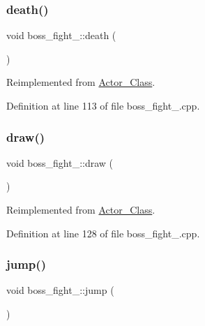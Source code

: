 \subsubsection{\texorpdfstring{death()}{death()}}
{\footnotesize\ttfamily void boss\+\_\+fight\+\_\+::death (\begin{DoxyParamCaption}{ }\end{DoxyParamCaption})\hspace{0.3cm}{\ttfamily [virtual]}}



Reimplemented from \hyperlink{class_actor___class_a9447c6154a674d7e6bdf24ff2874b7a8}{Actor\+\_\+\+Class}.



Definition at line 113 of file boss\+\_\+fight\+\_.\+cpp.

\hypertarget{classboss__fight__1_a83b20e761e3f8781c8fee8d2be5442b0}{}\label{classboss__fight__1_a83b20e761e3f8781c8fee8d2be5442b0} 
\subsubsection{\texorpdfstring{draw()}{draw()}}
{\footnotesize\ttfamily void boss\+\_\+fight\+\_\+::draw (\begin{DoxyParamCaption}{ }\end{DoxyParamCaption})\hspace{0.3cm}{\ttfamily [virtual]}}



Reimplemented from \hyperlink{class_actor___class_ac49cd62be76b4b950ecbe155413f1b64}{Actor\+\_\+\+Class}.



Definition at line 128 of file boss\+\_\+fight\+\_.\+cpp.

\hypertarget{classboss__fight__1_a363121fd16c5d41889f96405544bccc1}{}\label{classboss__fight__1_a363121fd16c5d41889f96405544bccc1} 
\subsubsection{\texorpdfstring{jump()}{jump()}}
{\footnotesize\ttfamily void boss\+\_\+fight\+\_\+::jump (\begin{DoxyParamCaption}{ }\end{DoxyParamCaption})\hspace{0.3cm}{\ttfamily [virtual]}}



